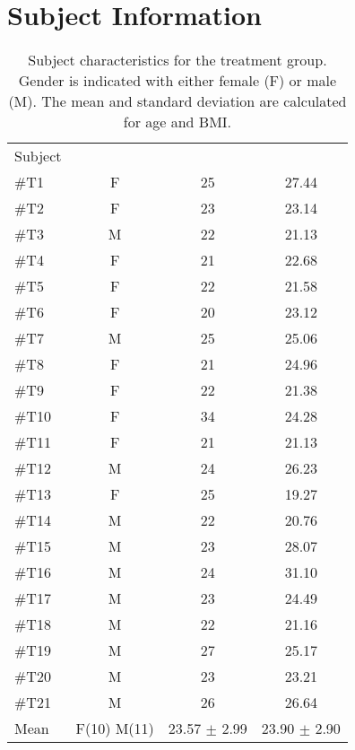 \chapter{Subject Information} \label{SubjectINFO}

\begin{longtable}{l|c|c|c}
	\caption{Subject characteristics for the treatment group. Gender is indicated with either female (F) or male (M). The mean and standard deviation are calculated for age and BMI.}
	\label{tab:subjectsA} \\
\cellcolor[HTML]{C0C0C0} {Subject} & 
\cellcolor[HTML]{C0C0C0}{Gender} & \cellcolor[HTML]{C0C0C0}{Age}  & \cellcolor[HTML]{C0C0C0}{BMI}  	\\  \rule{0pt}{3ex} 
\#T1 & F  & 25  & 27.44  \\ \hline \hline \rule{0pt}{3ex} 
\#T2 & F & 23 & 23.14  \\ \hline \hline \rule{0pt}{3ex} 
\#T3 & M & 22 & 21.13  \\ \hline \hline \rule{0pt}{3ex} 
\#T4 & F & 21  & 22.68  \\ \hline \hline \rule{0pt}{3ex} 
\#T5 & F & 22 & 21.58   \\ \hline \hline \rule{0pt}{3ex} 
\#T6 & F & 20 & 23.12 \\ \hline \hline \rule{0pt}{3ex} 
\#T7 & M & 25  & 25.06  \\ \hline \hline \rule{0pt}{3ex} 
	\#T8 & F & 21 & 24.96  \\ \hline \hline \rule{0pt}{3ex} 
	\#T9 & F & 22 & 21.38   \\ \hline \hline \rule{0pt}{3ex} 
	\#T10 & F & 34 & 24.28  \\ \hline \hline \rule{0pt}{3ex} 
	\#T11 & F & 21 & 21.13 \\ \hline \hline \rule{0pt}{3ex} 
\#T12 & M  & 24  & 26.23\\ \hline \hline \rule{0pt}{3ex} 
\#T13 &  F & 25 & 19.27 \\ \hline \hline \rule{0pt}{3ex} 
\#T14 & M  & 22 & 20.76  \\ \hline \hline \rule{0pt}{3ex} 
\#T15 & M & 23 & 28.07  \\ \hline \hline \rule{0pt}{3ex} 
\#T16 & M & 24 & 31.10 \\ \hline \hline \rule{0pt}{3ex} 
\#T17 & M & 23 & 24.49  \\ \hline \hline \rule{0pt}{3ex} 
	\#T18 & M & 22 & 21.16 \\ \hline \hline \rule{0pt}{3ex} 
	\#T19 & M & 27 & 25.17 \\ \hline \hline \rule{0pt}{3ex} 
	\#T20 & M & 23  & 23.21  \\ \hline \hline \rule{0pt}{3ex}
		\#T21 & M & 26 & 26.64   \\ \hline \hline \rule{0pt}{3ex} 
	Mean & F(10) M(11) & 23.57 $\pm$ 2.99  & 23.90 $\pm$ 2.90
	\\ \hline 
\end{longtable}
\vspace{-.5cm}


